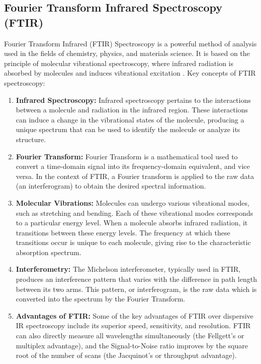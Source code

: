 \documentclass{cernatsnote}
\begin{document}
\subsection{Fourier Transform Infrared Spectroscopy (FTIR)}

Fourier Transform Infrared (FTIR) Spectroscopy is a powerful method of analysis used in the fields of chemistry, physics, and materials science. It is based on the principle of molecular vibrational spectroscopy, where infrared radiation is absorbed by molecules and induces vibrational excitation \cite{griffiths2007fourier}. Key concepts of FTIR spectroscopy:

\begin{enumerate}
\item \textbf{Infrared Spectroscopy:} Infrared spectroscopy pertains to the interactions between a molecule and radiation in the infrared region. These interactions can induce a change in the vibrational states of the molecule, producing a unique spectrum that can be used to identify the molecule or analyze its structure.

\item \textbf{Fourier Transform:} Fourier Transform is a mathematical tool used to convert a time-domain signal into its frequency-domain equivalent, and vice versa. In the context of FTIR, a Fourier transform is applied to the raw data (an interferogram) to obtain the desired spectral information.

\item \textbf{Molecular Vibrations:} Molecules can undergo various vibrational modes, such as stretching and bending. Each of these vibrational modes corresponds to a particular energy level. When a molecule absorbs infrared radiation, it transitions between these energy levels. The frequency at which these transitions occur is unique to each molecule, giving rise to the characteristic absorption spectrum.

\item \textbf{Interferometry:} The Michelson interferometer, typically used in FTIR, produces an interference pattern that varies with the difference in path length between its two arms. This pattern, or interferogram, is the raw data which is converted into the spectrum by the Fourier Transform.

\item \textbf{Advantages of FTIR:} Some of the key advantages of FTIR over dispersive IR spectroscopy include its superior speed, sensitivity, and resolution. FTIR can also directly measure all wavelengths simultaneously (the Fellgett’s or multiplex advantage), and the Signal-to-Noise ratio improves by the square root of the number of scans (the Jacquinot’s or throughput advantage).
\end{enumerate}
\end{document}
